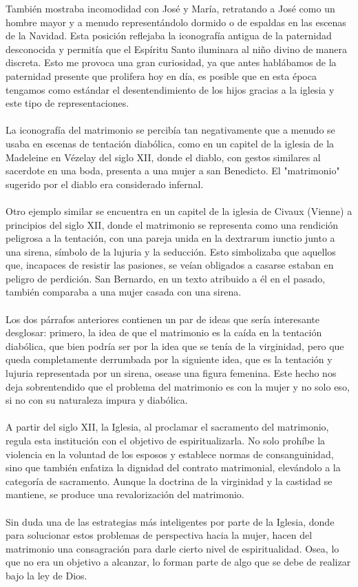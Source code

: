 \documentclass{report}
\begin{document}
También mostraba incomodidad con José y María, retratando a José como un hombre mayor y a menudo representándolo dormido o de espaldas en las escenas de la Navidad. Esta posición reflejaba la iconografía antigua de la paternidad desconocida y permitía que el Espíritu Santo iluminara al niño divino de manera discreta. Esto me provoca una gran curiosidad, ya que antes hablábamos de la paternidad presente que prolifera hoy en día, es posible que en esta época tengamos como estándar el desentendimiento de los hijos gracias a la iglesia y este tipo de representaciones.
\\\\
La iconografía del matrimonio se percibía tan negativamente que a menudo se usaba en escenas de tentación diabólica, como en un capitel de la iglesia de la Madeleine en Vézelay del siglo XII, donde el diablo, con gestos similares al sacerdote en una boda, presenta a una mujer a san Benedicto. El "matrimonio" sugerido por el diablo era considerado infernal.
\\\\
Otro ejemplo similar se encuentra en un capitel de la iglesia de Civaux (Vienne) a principios del siglo XII, donde el matrimonio se representa como una rendición peligrosa a la tentación, con una pareja unida en la dextrarum iunctio junto a una sirena, símbolo de la lujuria y la seducción. Esto simbolizaba que aquellos que, incapaces de resistir las pasiones, se veían obligados a casarse estaban en peligro de perdición. San Bernardo, en un texto atribuido a él en el pasado, también comparaba a una mujer casada con una sirena.
\\\\
Los dos párrafos anteriores contienen un par de ideas que sería interesante desglosar: primero, la idea de que el matrimonio es la caída en la tentación diabólica, que bien podría ser por la idea que se tenía de la virginidad, pero que queda completamente derrumbada por la siguiente idea, que es la tentación y lujuria representada por un sirena, osease una figura femenina. Este hecho nos deja sobrentendido que el problema del matrimonio es con la mujer y no solo eso, si no con su naturaleza impura y diabólica. 
\\\\
A partir del siglo XII, la Iglesia, al proclamar el sacramento del matrimonio, regula esta institución con el objetivo de espiritualizarla. No solo prohíbe la violencia en la voluntad de los esposos y establece normas de consanguinidad, sino que también enfatiza la dignidad del contrato matrimonial, elevándolo a la categoría de sacramento. Aunque la doctrina de la virginidad y la castidad se mantiene, se produce una revalorización del matrimonio.
\\\\
Sin duda una de las estrategias más inteligentes por parte de la Iglesia, donde para solucionar estos problemas de perspectiva hacia la mujer, hacen del matrimonio una consagración para darle cierto nivel de espiritualidad. Osea, lo que no era un objetivo a alcanzar, lo forman parte de algo que se debe de realizar bajo la ley de Dios.
\end{document}
